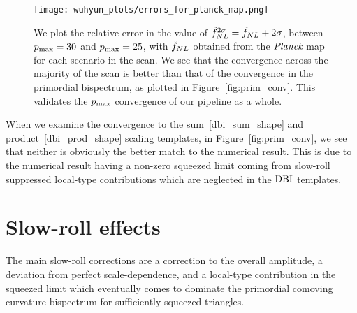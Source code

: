 \begin{figure}[h!]
\centering
\texttt{[image: wuhyun\_plots/errors\_for\_planck\_map.png]}
\caption{
    We plot the relative error in the value of $\tilde{f}_{NL}^{2\sigma}=\tilde{f}_{NL}+2\sigma$,
    between $p_\text{max}=30$ and $p_\text{max}=25$,
    with $\tilde{f}_{NL}$ obtained from the $\textit{Planck}$ map for each scenario in the scan.
    We see that the convergence across the majority of the scan is better than that of the
    convergence in the primordial bispectrum, as plotted in Figure~\ref{fig:prim_conv}.
    This validates the $p_\text{max}$ convergence of our pipeline as a whole.
}\label{fig:cmb_conv}
\end{figure}


    When we examine the convergence to the sum~\eqref{dbi_sum_shape}
    and product~\eqref{dbi_prod_shape} scaling templates,
    in Figure~\ref{fig:prim_conv},
    we see that neither is obviously the better match to the numerical result.
    This is due to the numerical result having a non-zero squeezed limit
    coming from slow-roll suppressed local-type contributions
    which are neglected in the $\text{DBI}$ templates.




\section{Slow-roll effects}
    The main slow-roll corrections are a correction to the overall amplitude,
    a deviation from perfect scale-dependence,
    and a local-type contribution in the squeezed limit which eventually comes to dominate
    the primordial comoving curvature bispectrum
    for sufficiently squeezed triangles.


